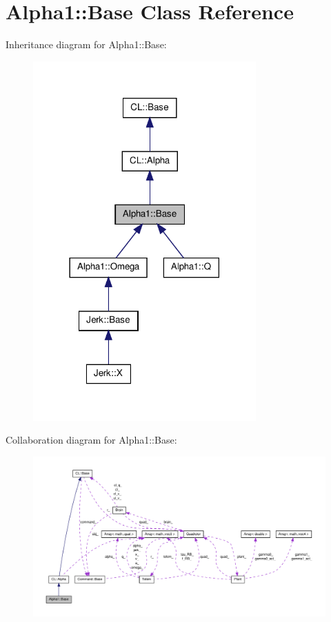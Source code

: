\hypertarget{classAlpha1_1_1Base}{\section{\-Alpha1\-:\-:\-Base \-Class \-Reference}
\label{classAlpha1_1_1Base}
}


\-Inheritance diagram for \-Alpha1\-:\-:\-Base\-:\nopagebreak
\begin{figure}[H]
\begin{center}
\leavevmode
\includegraphics[width=242pt]{classAlpha1_1_1Base__inherit__graph}
\end{center}
\end{figure}


\-Collaboration diagram for \-Alpha1\-:\-:\-Base\-:\nopagebreak
\begin{figure}[H]
\begin{center}
\leavevmode
\includegraphics[width=350pt]{classAlpha1_1_1Base__coll__graph}
\end{center}
\end{figure}
